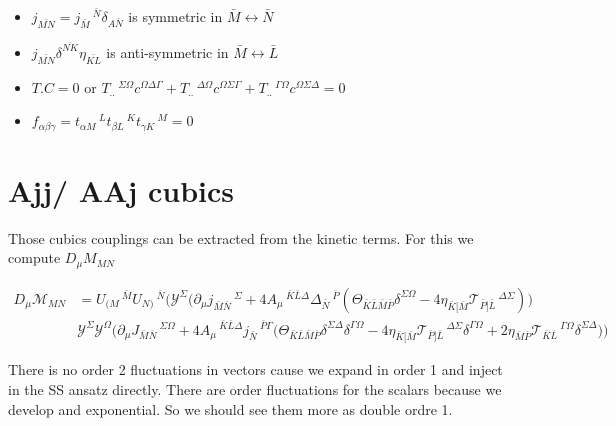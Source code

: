 \documentclass[11pt]{article}
\begin{document}
\begin{itemize}
\item $j_{\bar{MN}} = j_{\bar{M}}\,^{\bar{N}} \delta_{A\bar{N}}$ is symmetric in $\bar{M} \leftrightarrow \bar{N}$
\item $j_{\bar{MN}} \delta^{\bar{NK}} \eta_{\bar{KL}} $ is anti-symmetric in $\bar{M} \leftrightarrow \bar{L}$
\item $T.C = 0$ or $T_{..}\,^{\Sigma \Omega} c^{\Omega \Delta \Gamma} + T_{..}\,^{\Delta \Omega} c^{\Omega \Sigma  \Gamma} + T_{..}\,^{\Gamma \Omega} c^{\Omega \Sigma \Delta} = 0$
\item $f_{\alpha\beta\gamma} = t_{\alpha M}\,^{L} t_{\beta L}\,^{K} t_{\gamma K}\,^{M} = 0$
\end{itemize}

\section*{Ajj/ AAj cubics}

Those cubics couplings can be extracted from the kinetic terms. For this we compute $D_\mu M_{MN}$ 

\begin{equation}
	\begin{split}
	D_\mu \mathcal{M}_{MN} &= U_{(M}\,^{\bar M} U_{N)}\,^{\bar N} \Big(\mathcal{Y}^\Sigma \Big(\partial_\mu j_{\bar{M}\bar{N}}\,^{\Sigma} + 4 A_\mu\,^{\bar{K}\bar{L} \Delta} \Delta_{\bar N}\,^{\bar P} (\Theta_{\bar{K}\bar{L}\bar{M}\bar{P}}\delta^{\Sigma \Omega}-4\eta_{\bar K [ \bar M}\mathcal{T}_{\bar P]\bar L}\,^{\Delta \Sigma})\Big) \\ 
	&\mathcal{Y}^\Sigma \mathcal{Y}^\Omega \Big(\partial_\mu J_{\bar{M}\bar{N}}\,^{\Sigma \Omega}+ 4 A_\mu\,^{\bar{K}\bar{L}\Delta}j_{\bar{N}}\,^{\bar{P}\Gamma}\Big(\Theta_{\bar{K}\bar{L}\bar{M}\bar{P}}\delta^{\Sigma\Delta}\delta^{\Gamma\Omega} - 4\eta_{\bar{K}[\bar M}\mathcal{T}_{\bar P]\bar L}\,^{\Delta\Sigma}\delta^{\Gamma \Omega}+2\eta_{\bar{M}\bar{P}}\mathcal{T}_{\bar{K}\bar{L}}\,^{\Gamma\Omega}\delta^{\Sigma\Delta}\Big)\Big)
	\end{split}
\end{equation}

There is no order 2 fluctuations in vectors cause we expand in order 1 and inject in the SS ansatz directly. There are order fluctuations for the scalars because we develop and exponential. So we should see them more as double ordre 1. 

\end{document}
